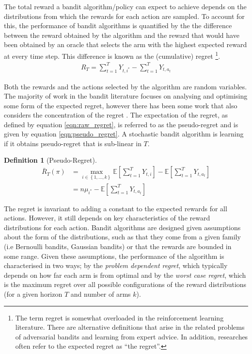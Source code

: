\documentclass[11pt,a4paper,oneside]{book}
\newcommand{\E}[1]{\mathbb E\left[{#1}\right]}
\newcommand{\set}[1]{\left\{#1\right\}}
\newcommand{\eqn}[1]{\begin{align}#1\end{align}}
\newcommand{\regret}{\bar{R}_{T}} %
\newcommand{\rawregret}{R_{T}} %
\newcommand{\quotes}[1]{``#1''}
\theoremstyle{plain}
\theoremstyle{definition}
\newtheorem{definition}[theorem]{Definition}
\begin{document}
The total reward a bandit algorithm/policy can expect to achieve depends on the distributions from which the rewards for each action are sampled. To account for this, the performance of bandit algorithms is quantified by the the difference between the reward obtained by the algorithm and the reward that would have been obtained by an oracle that selects the arm with the highest expected reward at every time step. This difference is known as the (cumulative) regret \footnote{The term regret is somewhat overloaded in the reinforcement learning literature. There are alternative definitions that arise in the related problems of adversarial bandits and learning from expert advice. In addition, researches often refer to the expected regret as \quotes{the regret}.}.
\eqn{
\label{eqn:raw_regret}
\rawregret = \sum_{t=1}^T Y_{t,i^*} - \sum_{t=1}^T Y_{t,a_t}
}

Both the rewards and the actions selected by the algorithm are random variables. The majority of work in the bandit literature focuses on analysing and optimising some form of the expected regret, however there has been some work that also considers the concentration of the regret \citep{Auer1995,Audibert2007,Audibert2009exploration}. The expectation of the regret, as defined by equation \ref{eqn:raw_regret}, is referred to as the pseudo-regret \citep{Bubeck2012} and is given by equation \ref{eqn:pseudo_regret}. A stochastic bandit algorithm is learning if it obtains pseudo-regret that is sub-linear in $T$. 

\vspace{0.5cm}
\begin{definition}[Pseudo-Regret]
\eqn{
\label{eqn:pseudo_regret}
\regret(\pi) &= \max_{i \in \set{1,...,k}}\E{\sum_{t=1}^T{Y_{t,i}}} - \E{\sum_{t=1}^T{Y_{t,a_t}}} \\
&= n\mu_{i^*} - \E{\sum_{t=1}^T{Y_{t,a_t}}}
}
\end{definition}

The regret is invariant to adding a constant to the expected rewards for all actions. However, it still depends on key characteristics of the reward distributions for each action. Bandit algorithms are designed given assumptions about the form of the distributions, such as that they come from a given family (i.e Bernoulli bandits, Gaussian bandits) or that the rewards are bounded in some range. Given these assumptions, the performance of the algorithm is characterised in two ways; by the \emph{problem dependent regret}, which typically depends on how far each arm is from optimal and by the \emph{worst case regret}, which is the maximum regret over all possible configurations of the reward distributions (for a given horizon $T$ and number of arms $k$).
\end{document}
